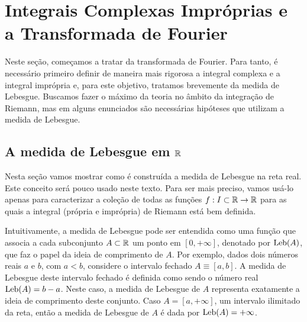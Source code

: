 \section{Integrais Complexas Impróprias e a Transformada de Fourier}
\label{sec:integrais-e-transf-fourier}

    Neste seção, começamos a tratar da transformada de Fourier. Para tanto, é necessário
    primeiro definir de maneira mais rigorosa a integral complexa e a integral imprópria e,
    para este objetivo, tratamos brevemente da medida de Lebesgue. Buscamos fazer o máximo da
    teoria no âmbito da integração de Riemann, mas em alguns enunciados são necessárias hipóteses
    que utilizam a medida de Lebesgue.
    
    \subsection{A medida de Lebesgue em \texorpdfstring{$\mathbb{R}$}{R}}
        Nesta seção vamos mostrar como é construída a medida de Lebesgue na reta real. 
        Este conceito será pouco usado neste texto. Para ser mais preciso, 
        vamos usá-lo apenas para caracterizar a coleção de todas as 
        funções $f:I\subset \mathbb{R}\to \mathbb{R}$ para as quais a integral 
        (própria e imprópria) de Riemann está bem definida. 
        
        Intuitivamente, a medida de Lebesgue pode ser entendida como uma 
        função que associa a cada subconjunto $A\subset \mathbb{R}$ um ponto 
        em $[0,+\infty]$, denotado por $\mathrm{Leb}(A)$, que faz o 
        papel da ideia de comprimento de $A$. 
        Por exemplo, dados dois números reais $a$ e $b$, com $a<b$, 
        considere o intervalo fechado $A\equiv[a,b]$. A medida de Lebesgue 
        deste intervalo fechado é definida como sendo o número real 
        $\mathrm{Leb}(A)=b-a$. Neste caso, a medida de Lebesgue
        de $A$ representa exatamente a ideia de comprimento deste conjunto.
        Caso $A=[a,+\infty]$, um intervalo ilimitado da reta, então 
        a medida de Lebesgue de $A$ é dada por $\mathrm{Leb}(A)=+\infty$. 
        
